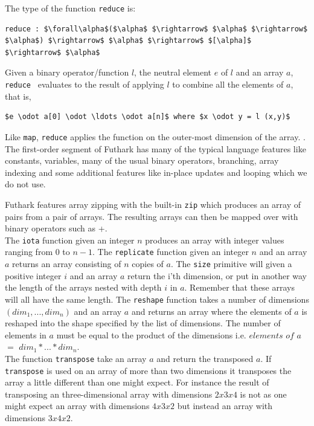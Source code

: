 \documentclass[11pt]{article}
\begin{document}
The type of the function {\tt reduce} is: 
\begin{lstlisting}[numbers=none,frame=none]
reduce : $\forall\alpha$($\alpha$ $\rightarrow$ $\alpha$ $\rightarrow$ $\alpha$) $\rightarrow$ $\alpha$ $\rightarrow$ $[\alpha]$ $\rightarrow$ $\alpha$
\end{lstlisting}
Given a binary operator/function $l$, the neutral element $e$ of $l$ and an array $a$,
{\tt reduce } evaluates to the result of applying $l$ to combine all the elements of $a$, that is,
\begin{lstlisting}[numbers=none,frame=none]
$e \odot a[0] \odot \ldots \odot a[n]$ where $x \odot y = l (x,y)$
\end{lstlisting}
Like {\tt map}, {\tt reduce} applies the function on the outer-most dimension of the array. \cite{TroelsHenriksen}.\\ 

The first-order segment of Futhark has many of the typical language features like constants, variables, many of the usual binary operators, branching, array indexing and some additional features like in-place updates and looping which we do not use.

Futhark features array zipping with the built-in {\tt zip} which produces an array of pairs from a pair of arrays.
The resulting arrays can then be mapped over with binary operators such as +.\\

The {\tt iota} function given an integer $n$ produces an array with integer values ranging from 0 to $n-1$.
The {\tt replicate} function given an integer $n$ and an array $a$ returns an array consisting of $n$ copies of $a$.
The {\tt size} primitive will given a positive integer $i$ and an array $a$ return the i'th dimension, or put in another way
the length of the arrays nested with depth $i$ in $a$. Remember that these arrays will all have the same length.
The {\tt reshape} function takes a number of dimensions $(dim_1,..., dim_n)$ and an array $a$ and returns an array where the elements of $a$ is reshaped into the shape specified by the list of dimensions.
The number of elements in $a$ must be equal to the product of the dimensions i.e. $elements$ $of$ $a$ $=$ $dim_1 * ... * dim_n$.\\

The function {\tt transpose} take an array $a$ and return the transposed $a$.
If {\tt transpose} is used on an array of more than two dimensions it transposes the array a little different than one might expect.
For instance the result of transposing an three-dimensional array with dimensions $2 x 3 x 4$ is not as one might expect an array with dimensions $4 x 3x 2$ but instead an array with dimensions $3x4x2$.\\
\end{document}

